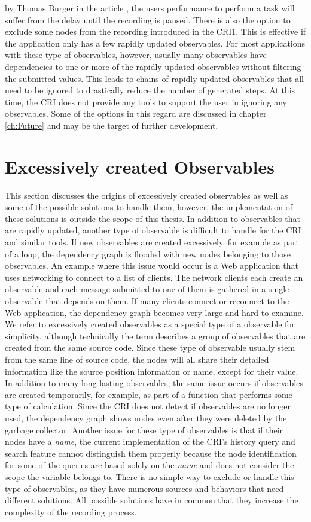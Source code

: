 by Thomas Burger in the article \cite{Perception}, the users performance to perform a task will suffer from the delay until the recording is paused.
There is also the option to exclude some nodes from the recording introduced in the CRI1. This is effective if the application only has a few rapidly updated observables. For most applications with these type of observables, however, usually many observables have dependencies to one or more of the rapidly updated observables without filtering the submitted values. This leads to chains of rapidly updated observables that all need to be ignored to drastically reduce the number of generated steps. At this time, the CRI does not provide any tools to support the user in ignoring any observables. Some of the options in this regard are discussed in chapter \ref{ch:Future} and may be the target of further development.

\section{Excessively created Observables}
\label{sec:DynamicallyCreated}
This section discusses the origins of excessively created observables as well as some of the possible solutions to handle them, however, the implementation of these solutions is outside the scope of this thesis.
In addition to observables that are rapidly updated, another type of observable is difficult to handle for the CRI and similar tools. If new observables are created excessively, for example as part of a loop, the dependency graph is flooded with new nodes belonging to those observables. An example where this issue would occur is a Web application that uses networking to connect to a list of clients. The network clients each create an observable and each message submitted to one of them is gathered in a single observable that depends on them. If many clients connect or reconnect to the Web application, the dependency graph becomes very large and hard to examine. We refer to excessively created observables as a special type of a observable for simplicity, although technically the term describes a group of observables that are created from the same source code. Since these type of observable usually stem from the same line of source code, the nodes will all share their detailed information like the source position information or name, except for their value. In addition to many long-lasting observables, the same issue occurs if observables are created temporarily, for example, as part of a function that performs some type of calculation. Since the CRI does not detect if observables are no longer used, the dependency graph shows nodes even after they were deleted by the garbage collector. Another issue for these type of observables is that if their nodes have a \emph{name}, the current implementation of the CRI's history query and search feature cannot distinguish them properly because the node identification for some of the queries are based solely on the \emph{name} and does not consider the scope the variable belongs to.
There is no simple way to exclude or handle this type of observables, as they have numerous sources and behaviors that need different solutions. All possible solutions have in common that they increase the complexity of the recording process.

